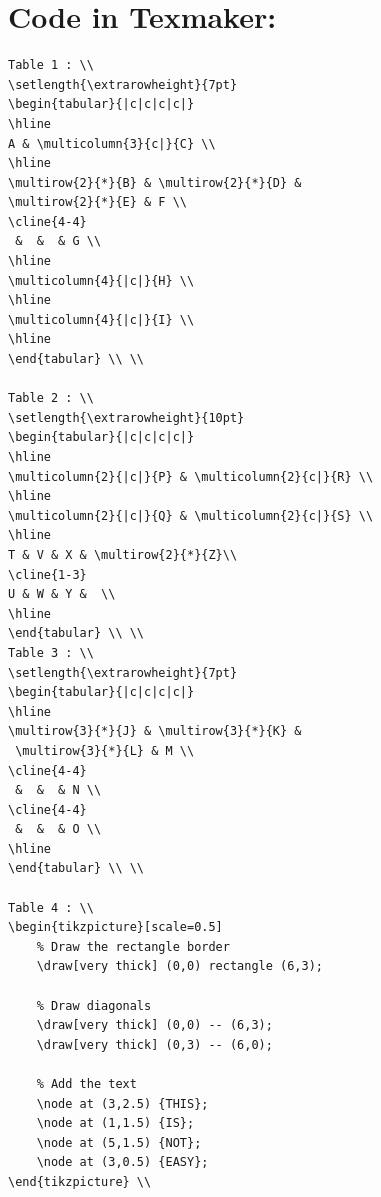 \documentclass[12pt]{article}
\begin{document}
\section{Code in Texmaker:}
\begin{verbatim}
Table 1 : \\
\setlength{\extrarowheight}{7pt}
\begin{tabular}{|c|c|c|c|}
\hline
A & \multicolumn{3}{c|}{C} \\
\hline
\multirow{2}{*}{B} & \multirow{2}{*}{D} & 
\multirow{2}{*}{E} & F \\
\cline{4-4}
 &  &  & G \\
\hline
\multicolumn{4}{|c|}{H} \\
\hline
\multicolumn{4}{|c|}{I} \\
\hline 
\end{tabular} \\ \\

Table 2 : \\
\setlength{\extrarowheight}{10pt}
\begin{tabular}{|c|c|c|c|}
\hline
\multicolumn{2}{|c|}{P} & \multicolumn{2}{c|}{R} \\
\hline
\multicolumn{2}{|c|}{Q} & \multicolumn{2}{c|}{S} \\
\hline
T & V & X & \multirow{2}{*}{Z}\\
\cline{1-3}
U & W & Y &  \\
\hline
\end{tabular} \\ \\
Table 3 : \\
\setlength{\extrarowheight}{7pt}
\begin{tabular}{|c|c|c|c|}
\hline
\multirow{3}{*}{J} & \multirow{3}{*}{K} &
 \multirow{3}{*}{L} & M \\
\cline{4-4}
 &  &  & N \\
\cline{4-4}
 &  &  & O \\
\hline
\end{tabular} \\ \\

Table 4 : \\
\begin{tikzpicture}[scale=0.5]
    % Draw the rectangle border
    \draw[very thick] (0,0) rectangle (6,3);

    % Draw diagonals
    \draw[very thick] (0,0) -- (6,3);
    \draw[very thick] (0,3) -- (6,0);

    % Add the text
    \node at (3,2.5) {THIS};
    \node at (1,1.5) {IS};
    \node at (5,1.5) {NOT};
    \node at (3,0.5) {EASY};
\end{tikzpicture} \\
\end{verbatim}
\end{document}
